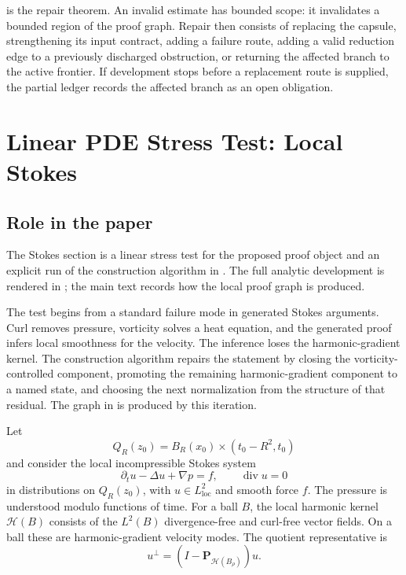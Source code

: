 \documentclass[11pt]{article}
\theoremstyle{plain}
\theoremstyle{definition}
\theoremstyle{remark}
\newcommand{\divergence}{\operatorname{div}}
\newcommand{\calH}{\mathcal H}
\newcommand{\proj}{\mathbf P}
\begin{document}
 is the repair theorem.  An invalid estimate has
bounded scope: it invalidates a bounded region of the proof graph.  Repair then
consists of replacing the capsule, strengthening its input contract, adding a
failure route, adding a valid reduction edge to a previously discharged
obstruction, or returning the affected branch to the active frontier.  If
development stops before a replacement route is supplied, the partial ledger
records the affected branch as an open obligation.

\section{Linear PDE Stress Test: Local Stokes}
\label{sec:stokes}

\subsection{Role in the paper}
The Stokes section is a linear stress test for the proposed proof object and an
explicit run of the construction algorithm in
.  The full analytic development is
rendered in ; the main text records how the local proof
graph is produced.

The test begins from a standard failure mode in generated Stokes arguments.
Curl removes pressure, vorticity solves a heat equation, and the generated
proof infers local smoothness for the velocity.  The inference loses the
harmonic-gradient kernel.  The construction algorithm repairs the statement by
closing the vorticity-controlled component, promoting the remaining
harmonic-gradient component to a named state, and choosing the next
normalization from the structure of that residual.  The graph in
 is produced by this iteration.

Let
\[
  Q_R(z_0)=B_R(x_0)\times(t_0-R^2,t_0)
\]
and consider the local incompressible Stokes system
\begin{equation}\label{eq:stokes-local-system}
  \partial_t u-\Delta u+\nabla p=f,\qquad \divergence u=0
\end{equation}
in distributions on \(Q_R(z_0)\), with \(u\in L^2_{\mathrm{loc}}\) and smooth
force \(f\).  The pressure is understood modulo functions of time.  For a ball
\(B\), the local harmonic kernel \(\calH(B)\) consists of the
\(L^2(B)\) divergence-free and curl-free vector fields.  On a ball these are
harmonic-gradient velocity modes.  The quotient representative is
\[
  u^\perp=(I-\proj_{\calH(B_\rho)})u .
\]
\end{document}
